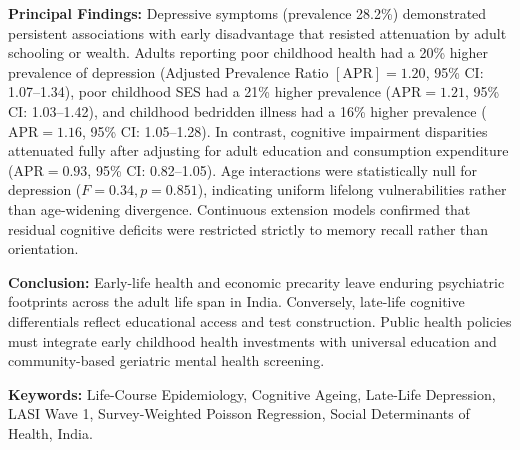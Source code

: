\vspace{0.3cm}
\noindent \textbf{Principal Findings:} 
Depressive symptoms (prevalence 28.2\%) demonstrated persistent associations with early disadvantage that resisted attenuation by adult schooling or wealth. Adults reporting poor childhood health had a 20\% higher prevalence of depression (Adjusted Prevalence Ratio $[\text{APR}] = 1.20$, 95\% CI: 1.07--1.34), poor childhood SES had a 21\% higher prevalence ($\text{APR} = 1.21$, 95\% CI: 1.03--1.42), and childhood bedridden illness had a 16\% higher prevalence ($\text{APR} = 1.16$, 95\% CI: 1.05--1.28). In contrast, cognitive impairment disparities attenuated fully after adjusting for adult education and consumption expenditure ($\text{APR} = 0.93$, 95\% CI: 0.82--1.05). Age interactions were statistically null for depression ($F=0.34, p=0.851$), indicating uniform lifelong vulnerabilities rather than age-widening divergence. Continuous extension models confirmed that residual cognitive deficits were restricted strictly to memory recall rather than orientation.

\vspace{0.3cm}
\noindent \textbf{Conclusion:} 
Early-life health and economic precarity leave enduring psychiatric footprints across the adult life span in India. Conversely, late-life cognitive differentials reflect educational access and test construction. Public health policies must integrate early childhood health investments with universal education and community-based geriatric mental health screening.

\vspace{0.5cm}
\noindent \textbf{Keywords:} Life-Course Epidemiology, Cognitive Ageing, Late-Life Depression, LASI Wave 1, Survey-Weighted Poisson Regression, Social Determinants of Health, India.

\newpage
\tableofcontents
\newpage
{}
\setcounter{page}{1}
